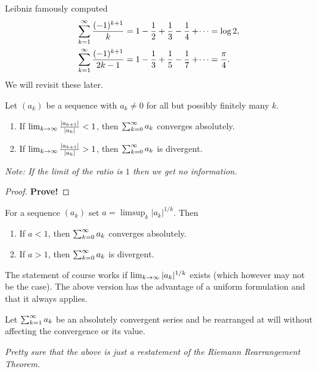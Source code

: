\documentclass[10pt, a4paper]{article}
\begin{document}
\begin{remark}\label{pre:analy:remark:leibnizlogformula}
    Leibniz famously computed
    \begin{align*}
        \infsum\frac{(-1) ^ {k + 1}}{k} &= 1 - \frac{1}{2} + \frac{1}{3} - \frac{1}{4} + \dotsi = \log{2}, \\
        \infsum\frac{(-1) ^ {k + 1}}{2k - 1} &= 1 - \frac{1}{3} + \frac{1}{5} - \frac{1}{7} + \dotsi = \frac{\pi}{4}.
    \end{align*}
    We will revisit these later.
\end{remark}

\begin{theorem}
    Let $(a_k)$ be a sequence with $a_k \neq 0$ for all but possibly finitely many $k$.
    \begin{enumerate}[label = (\roman*)]
        \item If $\liminfty[k]\frac{|a_{k + 1}|}{|a_k|} < 1$,
        then $\infsum[k = 0]a_k$ converges absolutely.
        \item If $\liminfty[k]\frac{|a_{k + 1}|}{|a_k|} > 1$,
        then $\infsum[k = 0]a_k$ is divergent.
    \end{enumerate}
    \textit{Note:
    If the limit of the ratio is $1$ then we get no information.}
    \begin{proof}
        \textbf{Prove!}
    \end{proof}
\end{theorem}

\begin{theorem}
    For a sequence $(a_k)$ set $a = \limsup_k|a_k| ^ {1 / k}$.
    Then
    \begin{enumerate}[label = (\roman*)]
        \item If $a < 1$,
        then $\infsum[k = 0]a_k$ converges absolutely.
        \item If $a > 1$,
        then $\infsum[k = 0]a_k$ is divergent.
    \end{enumerate}
\end{theorem}

\begin{remark}
    The statement of course works if $\liminfty[k]|a_k| ^ {1 / k}$ exists
    (which however may not be the case).
    The above version has the advantage of a uniform formulation and that it always applies.
\end{remark}

\begin{theorem}
    Let $\infsum a_k$ be an absolutely convergent series and be rearranged at will without affecting the convergence or its value.
\end{theorem}
\textit{Pretty sure that the above is just a restatement of the Riemann Rearrangement Theorem.}
\end{document}
